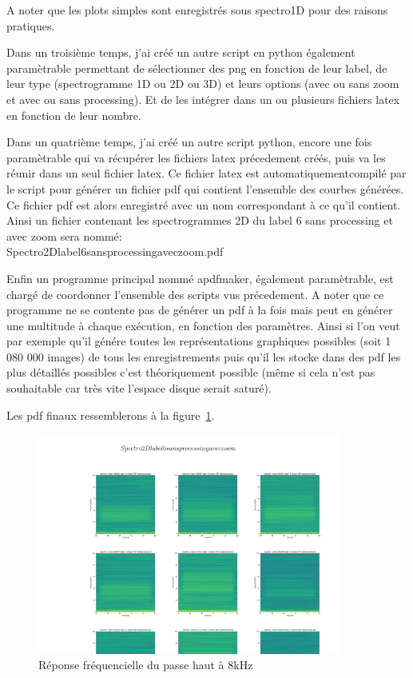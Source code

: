 A noter que les plots simples sont enregistrés sous spectro1D pour des raisons pratiques.

Dans un troisième temps, j'ai créé un autre script en python également paramètrable permettant de sélectionner des png en fonction de leur label, de leur type (spectrogramme 1D ou 2D ou 3D) et leurs options (avec ou sans zoom et avec ou sans processing). 
Et de les intégrer dans un ou plusieurs fichiers latex en fonction de leur nombre.

Dans un quatrième temps, j'ai créé un autre script python, encore une fois paramètrable qui va récupérer les fichiers latex précedement créés, puis va les réunir dans un seul fichier latex. 
Ce fichier latex est automatiquementcompilé par le script pour générer un fichier pdf
qui contient l'ensemble des courbes générées. 
Ce fichier pdf est alors enregistré avec un nom correspondant à ce qu'il contient. Ainsi un fichier contenant les spectrogrammes 2D du label 6 sans processing et avec zoom sera nommé:\\ Spectro2Dlabel6sansprocessingaveczoom.pdf

Enfin un programme principal nommé apdfmaker, également paramètrable, est chargé de coordonner l'ensemble des scripts vus précedement. 
A noter que ce programme ne se contente pas de générer un pdf à la fois mais peut
en générer une multitude à chaque exécution, en fonction des paramètres. 
Ainsi si l'on veut par exemple qu'il génére toutes les représentations graphiques possibles (soit 1 080 000 images) de tous les enregistrements puis qu'il les stocke dans des pdf les plus détaillés possibles c'est théoriquement possible (même si cela n'est pas souhaitable  car très vite l'espace disque serait saturé).

Les pdf finaux ressemblerons à la figure~\ref{fig:exempledepdf}.

\begin{figure}[!h]
\centering
\includegraphics[width=10cm]{./images/pdfexemple.png}
\caption{Réponse fréquencielle du passe haut à 8kHz%
\label{fig:exempledepdf}}
\end{figure}
